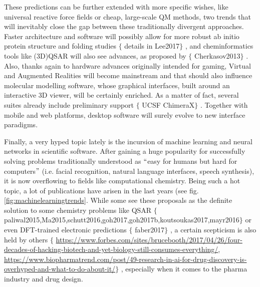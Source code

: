 These predictions can be further extended with more specific wishes, like universal reactive force fields or cheap, large-scale QM methods, two trends that will inevitably close the gap between these traditionally divergent approaches. Faster architecture and software will possibly allow for more robust ab initio protein structure and folding studies $ \{ $ details in Lee2017$ \} $ , and cheminformatics tools like (3D)QSAR will also see advances, as proposed by $ \{ $ Cherkasov2013$ \} $ . Also, thanks again to hardware advances originally intended for gaming, Virtual and Augmented Realities will become mainstream and that should also influence molecular modelling software, whose graphical interfaces, built around an interactive 3D viewer, will be certainly enriched. As a matter of fact, several suites already include preliminary support $ \{ $ UCSF ChimeraX$ \} $ . Together with mobile and web platforms, desktop software will surely evolve to new interface paradigms.

Finally, a very hyped topic lately is the incursion of machine learning and neural networks in scientific software. After gaining a huge popularity for successfully solving problems traditionally understood as $``$easy for humans but hard for computers$"$  (i.e. facial recognition, natural language interfaces, speech synthesis), it is now overflowing to fields like computational chemistry. Being such a hot topic, a lot of publications have arisen in the last years (see fig. \ref{fig:machinelearningtrends}. While some see these proposals as the definite solution to some chemistry problems like QSAR $ \{ $ paliwal2015,Ma2015,schutt2016,goh2017,goh2017b,koutsoukas2017,mayr2016$ \} $  or even DFT-trained electronic predictions $ \{ $ faber2017$ \} $ , a certain scepticism is also held by others $ \{ $ \href{https://www.forbes.com/sites/brucebooth/2017/04/26/four-decades-of-hacking-biotech-and-yet-biology-still-consumes-everything/}{https://www.forbes.com/sites/brucebooth/2017/04/26/four-decades-of-hacking-biotech-and-yet-biology-still-consumes-everything/}, \href{https://www.biopharmatrend.com/post/49-research-in-ai-for-drug-discovery-is-overhyped-and-what-to-do-about-it/}{https://www.biopharmatrend.com/post/49-research-in-ai-for-drug-discovery-is-overhyped-and-what-to-do-about-it/}$ \} $ , especially when it comes to the pharma industry and drug design.


